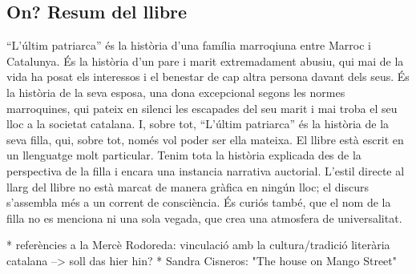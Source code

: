 \subsection{On? Resum del llibre}
``L'últim patriarca'' és la història d'una família marroqiuna entre Marroc i Catalunya.
És la història d'un pare i marit extremadament abusiu, qui mai de la vida ha posat els interessos i el benestar de cap altra persona davant dels seus.
És la història de la seva esposa, una dona excepcional segons les normes marroquines, qui pateix en silenci les escapades del seu marit i mai troba el seu lloc a la societat catalana.
I, sobre tot, ``L'últim patriarca'' és la història de la seva filla, qui, sobre tot, només vol poder ser ella mateixa.
El llibre està escrit en un llenguatge molt particular.
Tenim tota la història explicada des de la perspectiva de la filla i encara una instancia narrativa auctorial.
L'estil directe al llarg del llibre no està marcat de manera gràfica en ningún lloc; el discurs s'assembla més a un corrent de consciència.
És curiós també, que el nom de la filla no es menciona ni una sola vegada, que crea una atmosfera de universalitat.

* referències a la Mercè Rodoreda: vinculació amb la cultura/tradició literària catalana --> soll das hier hin?
* Sandra Cisneros: "The house on Mango Street"

